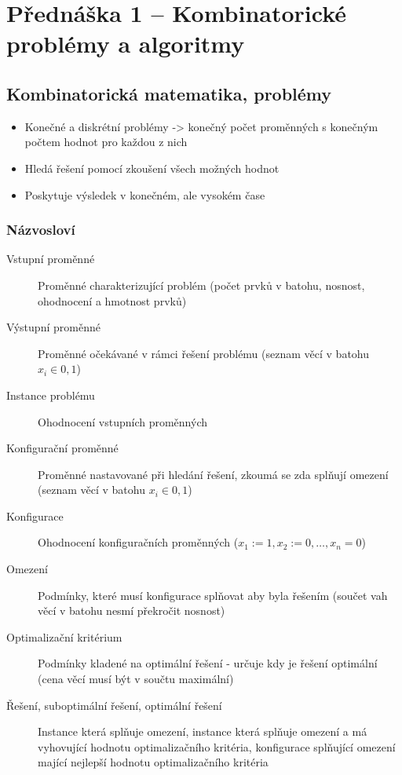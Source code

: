 \section{Přednáška 1 -- Kombinatorické problémy a algoritmy}

\subsection{Kombinatorická matematika, problémy}

\begin{itemize}
    \item Konečné a diskrétní problémy -> konečný počet proměnných s konečným počtem hodnot pro každou z nich
    \item Hledá řešení pomocí zkoušení všech možných hodnot
    \item Poskytuje výsledek v konečném, ale vysokém čase
\end{itemize}

\subsubsection{Názvosloví}

\begin{description}
    \item[Vstupní proměnné] Proměnné charakterizující problém (počet prvků v batohu, nosnost, ohodnocení a hmotnost prvků)
    \item[Výstupní proměnné] Proměnné očekávané v rámci řešení problému (seznam věcí v batohu $x_i \in {0,1}$)
    \item[Instance problému] Ohodnocení vstupních proměnných
    \item[Konfigurační proměnné] Proměnné nastavované při hledání řešení, zkoumá se zda splňují omezení (seznam věcí v batohu $x_i \in {0,1}$)
    \item[Konfigurace] Ohodnocení konfiguračních proměnných ($x_1 := 1, x_2:= 0, \ldots, x_n = 0$)
    \item[Omezení] Podmínky, které musí konfigurace splňovat aby byla řešením (součet vah věcí v batohu nesmí překročit nosnost)
    \item[Optimalizační kritérium] Podmínky kladené na optimální řešení - určuje kdy je řešení optimální (cena věcí musí být v součtu maximální)
    \item[Řešení, suboptimální řešení, optimální řešení] Instance která splňuje omezení, instance která splňuje omezení a má vyhovující hodnotu optimalizačního kritéria, konfigurace splňující omezení mající nejlepší hodnotu optimalizačního kritéria
\end{description}

